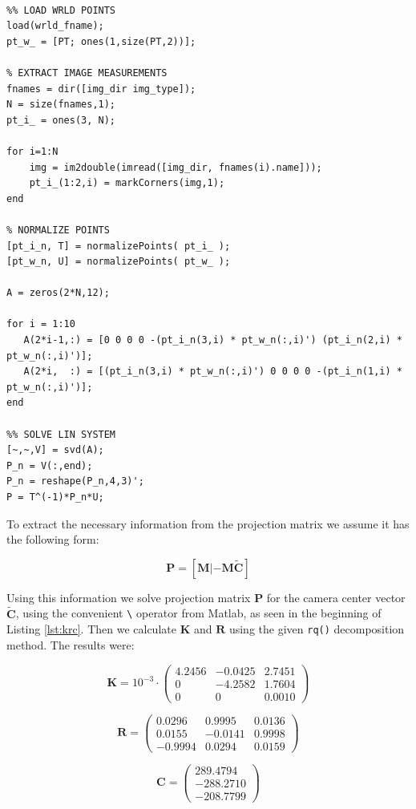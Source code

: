 \documentclass[
a4paper,     %
11pt         %
]{scrartcl}  %
\begin{document}
\begin{lstlisting}[label=lst:pcalc, caption=Matlab script setting up linear equation system]

%% LOAD WRLD POINTS
load(wrld_fname);
pt_w_ = [PT; ones(1,size(PT,2))];

% EXTRACT IMAGE MEASUREMENTS
fnames = dir([img_dir img_type]);
N = size(fnames,1);
pt_i_ = ones(3, N);

for i=1:N
    img = im2double(imread([img_dir, fnames(i).name]));
    pt_i_(1:2,i) = markCorners(img,1);
end

% NORMALIZE POINTS
[pt_i_n, T] = normalizePoints( pt_i_ );
[pt_w_n, U] = normalizePoints( pt_w_ );

A = zeros(2*N,12);

for i = 1:10
   A(2*i-1,:) = [0 0 0 0 -(pt_i_n(3,i) * pt_w_n(:,i)') (pt_i_n(2,i) * pt_w_n(:,i)')];
   A(2*i,  :) = [(pt_i_n(3,i) * pt_w_n(:,i)') 0 0 0 0 -(pt_i_n(1,i) * pt_w_n(:,i)')];
end

%% SOLVE LIN SYSTEM
[~,~,V] = svd(A);
P_n = V(:,end);
P_n = reshape(P_n,4,3)';
P = T^(-1)*P_n*U;
\end{lstlisting}

To extract the necessary information from the projection matrix we assume it has the following form:

$$ \mathbf{P} = \mathbf{[M|-M\tilde{C}]} $$

Using this information we solve projection matrix $\mathbf{P}$ for the camera center vector $\mathbf{\tilde{C}}$, using the convenient \lstinline{\} operator from Matlab, as seen in the beginning of Listing \ref{lst:krc}.
Then we calculate $\mathbf{K}$ and $\mathbf{R}$ using the given \lstinline{rq()} decomposition method.
The results were:

$$
\mathbf{K} = 10^{-3} \cdot \left(\begin{array}{lll}
4.2456 & -0.0425 & 2.7451\\
0 & -4.2582 & 1.7604\\
0 & 0 & 0.0010
\end{array}\right)
$$

$$
\mathbf{R} = \left(\begin{array}{lll}
0.0296 & 0.9995 & 0.0136\\
0.0155 & -0.0141 & 0.9998\\
-0.9994 & 0.0294 & 0.0159
\end{array}\right)
$$

$$
\mathbf{C} = \left(\begin{array}{l}
289.4794\\
-288.2710\\
-208.7799
\end{array}\right)
$$
\end{document}
